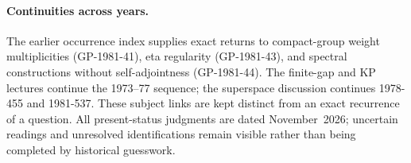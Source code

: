 \paragraph{Continuities across years.}
The earlier occurrence index supplies exact returns to compact-group weight
multiplicities (GP-1981-41), eta regularity (GP-1981-43), and spectral
constructions without self-adjointness (GP-1981-44). The finite-gap and KP
lectures continue the 1973--77 sequence; the superspace discussion continues
1978-455 and 1981-537. These subject links are kept distinct from an exact
recurrence of a question. All present-status judgments are dated
November~2026; uncertain readings and unresolved identifications remain
visible rather than being completed by historical guesswork.
